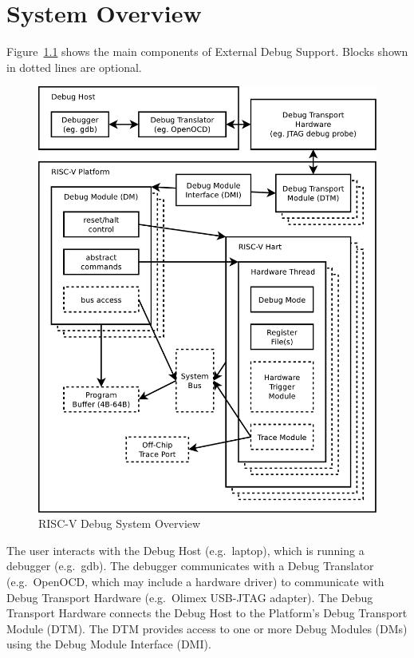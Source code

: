 \chapter{System Overview} \label{overview}

Figure~\ref{fig:overview} shows the main components of External Debug Support.
Blocks shown in dotted lines are optional. 

\begin{figure}
   \centering
   \includegraphics[width=\textwidth]{fig/overview-eps-converted-to.pdf}
   \caption{RISC-V Debug System Overview}
   \label{fig:overview}
\end{figure}

The user interacts with the Debug Host (e.g.\ laptop), which is running a
debugger (e.g.\ gdb).  The debugger communicates with a Debug Translator (e.g.\ 
OpenOCD, which may include a hardware driver) to communicate with Debug
Transport Hardware (e.g.\ Olimex USB-JTAG adapter).
The Debug Transport Hardware connects the Debug Host to the Platform's Debug
Transport Module (DTM).  The DTM provides access to one or more Debug Modules
(DMs) using the Debug Module Interface (DMI).

